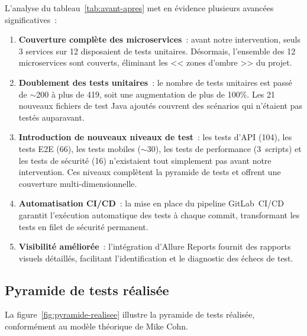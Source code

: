 L'analyse du tableau~\ref{tab:avant-apres} met en \'{e}vidence plusieurs
avanc\'{e}es significatives~:

\begin{enumerate}[leftmargin=*]
  \item \textbf{Couverture compl\`{e}te des microservices}~: avant notre
    intervention, seuls 3 services sur 12 disposaient de tests unitaires.
    D\'{e}sormais, l'ensemble des 12 microservices sont couverts, \'{e}liminant
    les << zones d'ombre >> du projet.

  \item \textbf{Doublement des tests unitaires}~: le nombre de tests
    unitaires est pass\'{e} de $\sim$200 \`{a} plus de 419, soit une augmentation
    de plus de 100\%. Les 21 nouveaux fichiers de test Java ajout\'{e}s
    couvrent des sc\'{e}narios qui n'\'{e}taient pas test\'{e}s auparavant.

  \item \textbf{Introduction de nouveaux niveaux de test}~: les tests
    d'API (104), les tests E2E (66), les tests mobiles ($\sim$30), les
    tests de performance (3~scripts) et les tests de s\'{e}curit\'{e} (16)
    n'existaient tout simplement pas avant notre intervention. Ces
    niveaux compl\`{e}tent la pyramide de tests et offrent une couverture
    multi-dimensionnelle.

  \item \textbf{Automatisation CI/CD}~: la mise en place du pipeline
    GitLab~CI/CD garantit l'ex\'{e}cution automatique des tests \`{a} chaque
    commit, transformant les tests en filet de s\'{e}curit\'{e} permanent.

  \item \textbf{Visibilit\'{e} am\'{e}lior\'{e}e}~: l'int\'{e}gration d'Allure Reports
    fournit des rapports visuels d\'{e}taill\'{e}s, facilitant l'identification
    et le diagnostic des \'{e}checs de test.
\end{enumerate}

\subsection{Pyramide de tests r\'{e}alis\'{e}e}

La figure~\ref{fig:pyramide-realisee} illustre la pyramide de tests
r\'{e}alis\'{e}e, conform\'{e}ment au mod\`{e}le th\'{e}orique de Mike Cohn.

